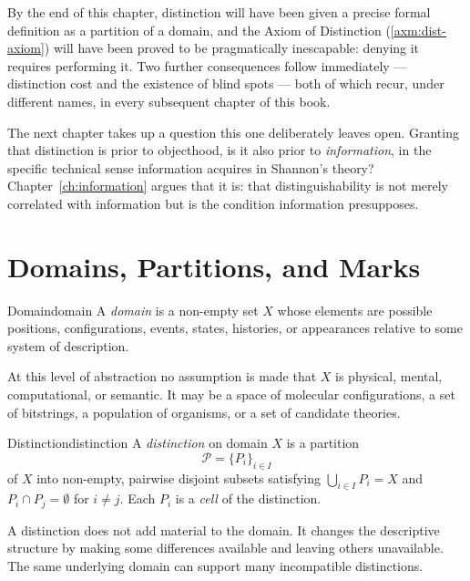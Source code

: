 \documentclass[12pt,twoside,openright]{book}
\newcommand{\partition}{\mathcal{P}}
\begin{document}
By the end of this chapter, distinction will have been given a
precise formal definition as a partition of a domain, and the
Axiom of Distinction (\cref{axm:dist-axiom}) will have been
proved to be pragmatically inescapable: denying it requires
performing it. Two further consequences follow immediately ---
distinction cost and the existence of blind spots --- both of
which recur, under different names, in every subsequent
chapter of this book.

The next chapter takes up a question this one deliberately
leaves open. Granting that distinction is prior to objecthood,
is it also prior to \emph{information}, in the specific
technical sense information acquires in Shannon's theory?
Chapter~\ref{ch:information} argues that it is: that
distinguishability is not merely correlated with information
but is the condition information presupposes.

\section{Domains, Partitions, and Marks}
\label{sec:ch1-domain}

\begin{definition}{Domain}{domain}
  A \emph{domain} is a non-empty set $X$ whose elements
  are possible positions, configurations, events, states,
  histories, or appearances relative to some system of
  description. 
\end{definition}

At this level of abstraction no assumption is made that
$X$ is physical, mental, computational, or semantic.
It may be a space of molecular configurations, a set of
bitstrings, a population of organisms, or a set of
candidate theories.

\begin{definition}{Distinction}{distinction}
  A \emph{distinction} on domain $X$ is a partition
  \[
    \partition = \{P_i\}_{i \in I}
  \]
  of $X$ into non-empty, pairwise disjoint subsets
  satisfying $\bigcup_{i \in I} P_i = X$ and
  $P_i \cap P_j = \emptyset$ for $i \ne j$.
  Each $P_i$ is a \emph{cell} of the distinction.
\end{definition}

A distinction does not add material to the domain. It
changes the descriptive structure by making some
differences available and leaving others unavailable.
The same underlying domain can support many incompatible
distinctions.
\end{document}
